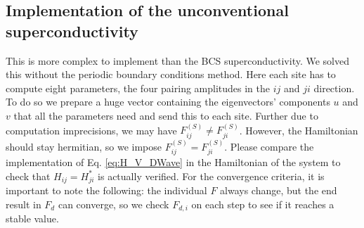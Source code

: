 \documentclass[../main.tex]{subfile}
\begin{document}
\subsection{Implementation of the unconventional superconductivity}


This is more complex to implement than the BCS superconductivity. We solved this without the periodic boundary conditions method.
Here each site has to compute eight parameters, the four pairing amplitudes in the $ij$ and $ji$ direction.
To do so we prepare a huge vector containing the eigenvectors' components $u$ and $v$ that all the parameters need and send this to each site.
Further due to computation imprecisions, we may have $F^{(S)}_{ij} \neq F^{(S)}_{ji}$. However, the Hamiltonian
should stay hermitian, so we impose $F^{(S)}_{ij} = F^{(S)}_{ji}$. Please compare the implementation of Eq. \ref{eq:H_V_DWave} in 
the Hamiltonian of the system to check that $H_{ij} = H_{ji}^{\ast}$ is
actually verified. For the convergence criteria, it is important to note the following:
the individual $F$ always change, but the end result in $F_d$ can converge, so we check $F_{d,i}$ on each step to see if it reaches a stable value.\\
\end{document}
